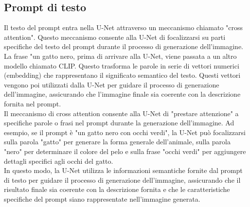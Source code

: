\subsection{Prompt di testo}
Il testo del prompt entra nella U-Net attraverso un meccanismo chiamato "cross attention". Questo meccanismo consente alla U-Net di focalizzarsi su parti specifiche del testo del prompt durante il processo di generazione dell'immagine.\\

La frase "un gatto nero, prima di arrivare alla U-Net, viene passata a un altro modello chiamato CLIP. Questo trasforma le parole in serie di vettori numerici (embedding) che rappresentano il significato semantico del testo. Questi vettori vengono poi utilizzati dalla U-Net per guidare il processo di generazione dell'immagine, assicurando che l'immagine finale sia coerente con la descrizione fornita nel prompt.\\

Il meccanismo di cross attention consente alla U-Net di "prestare attenzione" a specifiche parole o frasi nel prompt durante la generazione dell'immagine. Ad esempio, se il prompt è "un gatto nero con occhi verdi", la U-Net può focalizzarsi sulla parola "gatto" per generare la forma generale dell'animale, sulla parola "nero" per determinare il colore del pelo e sulla frase "occhi verdi" per aggiungere dettagli specifici agli occhi del gatto.\\
In questo modo, la U-Net utilizza le informazioni semantiche fornite dal prompt di testo per guidare il processo di generazione dell'immagine, assicurando che il risultato finale sia coerente con la descrizione fornita e che le caratteristiche specifiche del prompt siano rappresentate nell'immagine generata.\\

